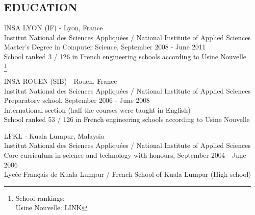 \documentclass[11pt]{res} %
\newcommand{\footnoteremember}[2]{
\footnote{#2}
\newcounter{#1}
\setcounter{#1}{\value{footnote}}
}
\newcommand{\footnoterecall}[1]{
\footnotemark[\value{#1}]
}
\begin{document}
 
 
\address{5 rue du boulevard \\  69100, Villeurbanne\\ France \\ (+33) 6 80 90 78 17}

                                             
\begin{resume}
 
\section{EDUCATION} 
 \noindent INSA LYON (IF) - Lyon, France \\
Institut National des Sciences Appliqu\'ees / National Institute of Applied Sciences\\
Master's Degree in Computer Science, September 2008 - June 2011 \\
School ranked 3 / 126 in French engineering schools according to Usine Nouvelle\footnoteremember{usine_nouvelle}{School rankings:\\
Usine Nouvelle: LINK}

 \noindent INSA ROUEN (SIB) - Rouen, France \\
Institut National des Sciences Appliqu\'ees / National Institute of Applied Sciences\\
Preparatory school, September 2006 - June 2008 \\
International section (half the courses were taught in English) \\
School ranked 53 / 126 in French engineering schools according to Usine Nouvelle\footnoterecall{usine_nouvelle}

 \noindent LFKL - Kuala Lumpur, Malaysia \\
Institut National des Sciences Appliquées / National Institute of Applied Sciences\\
Core curriculum in science and technology with honours, September 2004 - June 2006 \\
Lyc\'ee Français de Kuala Lumpur / French School of Kuala Lumpur (High school)


\end{resume}
\end{document}
